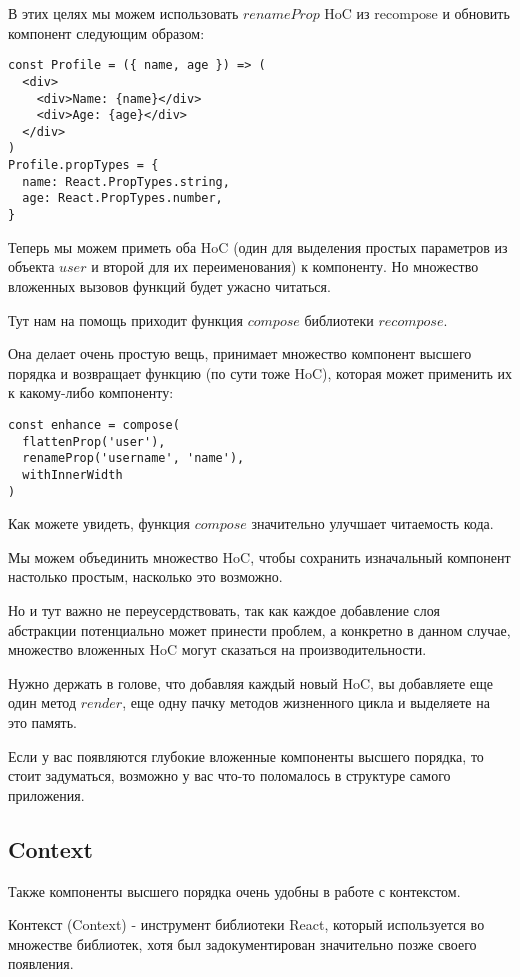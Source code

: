 В этих целях мы можем использовать $renameProp$ HoC из recompose и обновить компонент следующим образом:

\begin{lstlisting}
const Profile = ({ name, age }) => (
  <div>
    <div>Name: {name}</div>
    <div>Age: {age}</div>
  </div>
)
Profile.propTypes = {
  name: React.PropTypes.string,
  age: React.PropTypes.number,
}
\end{lstlisting}

Теперь мы можем приметь оба HoC (один для выделения простых параметров из объекта $user$ и второй для их переименования) к компоненту. Но множество вложенных вызовов функций будет ужасно читаться.

Тут нам на помощь приходит функция $compose$ библиотеки $recompose$.

Она делает очень простую вещь, принимает множество компонент высшего порядка и возвращает функцию (по сути тоже HoC), которая может применить их к какому-либо компоненту:

\begin{lstlisting}
const enhance = compose(
  flattenProp('user'),
  renameProp('username', 'name'),
  withInnerWidth
)
\end{lstlisting}

Как можете увидеть, функция $compose$ значительно улучшает читаемость кода.

Мы можем объединить множество HoC, чтобы сохранить изначальный компонент настолько простым, насколько это возможно.

Но и тут важно не переусердствовать, так как каждое добавление слоя абстракции потенциально может принести проблем, а конкретно в данном случае, множество вложенных HoC могут сказаться на производительности.

Нужно держать в голове, что добавляя каждый новый HoC, вы добавляете еще один метод $render$, еще одну пачку методов жизненного цикла и выделяете на это память.

Если у вас появляются глубокие вложенные компоненты высшего порядка, то стоит задуматься, возможно у вас что-то поломалось в структуре самого приложения.

\subsection{Context}

Также компоненты высшего порядка очень удобны в работе с контекстом.

Контекст (Context) - инструмент библиотеки React, который используется во множестве библиотек, хотя был задокументирован значительно позже своего появления.

